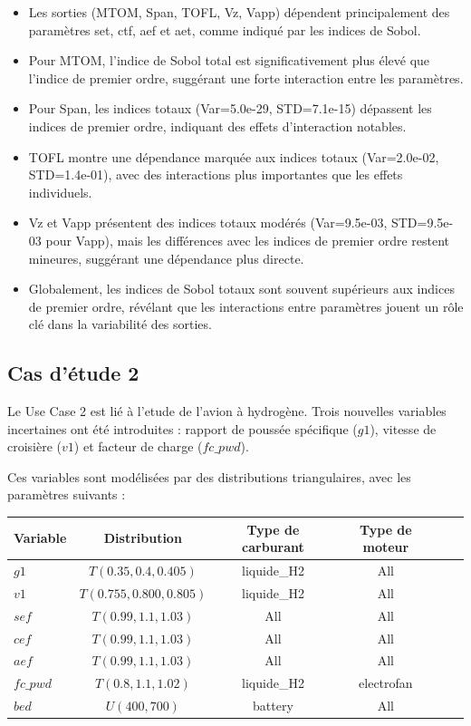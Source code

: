 \documentclass[a4paper, 11pt]{article}
\begin{document}
\begin{itemize}
    \item Les sorties (MTOM, Span, TOFL, Vz, Vapp) dépendent principalement des paramètres set, ctf, aef et aet, comme indiqué par les indices de Sobol.
    \item Pour MTOM, l'indice de Sobol total est significativement plus élevé que l'indice de premier ordre, suggérant une forte interaction entre les paramètres.
    \item Pour Span, les indices totaux (Var=5.0e-29, STD=7.1e-15) dépassent les indices de premier ordre, indiquant des effets d'interaction notables.
    \item TOFL montre une dépendance marquée aux indices totaux (Var=2.0e-02, STD=1.4e-01), avec des interactions plus importantes que les effets individuels.
    \item Vz et Vapp présentent des indices totaux modérés (Var=9.5e-03, STD=9.5e-03 pour Vapp), mais les différences avec les indices de premier ordre restent mineures, suggérant une dépendance plus directe.
    \item Globalement, les indices de Sobol totaux sont souvent supérieurs aux indices de premier ordre, révélant que les interactions entre paramètres jouent un rôle clé dans la variabilité des sorties.
\end{itemize}



\subsection{Cas d'étude 2}


Le Use Case 2 est lié à l'etude de l'avion à hydrogène. Trois nouvelles variables incertaines ont été introduites : rapport de poussée spécifique (\( g1 \)), vitesse de croisière (\( v1 \)) et facteur de charge (\( fc\_pwd \)). \newline

Ces variables sont modélisées par des distributions triangulaires, avec les paramètres suivants :

\begin{center}
\begin{tabular}{lccccc}
\toprule
Variable & Distribution & Type de carburant & Type de moteur \\
\midrule
\( g1 \) & \( T(0.35, 0.4, 0.405) \) & liquide\_H2 & All \\
\( v1 \) & \( T(0.755, 0.800, 0.805) \) & liquide\_H2 & All \\
\( sef \) & \( T(0.99, 1.1, 1.03) \) & All & All \\
\( cef \) & \( T(0.99, 1.1, 1.03) \) & All & All \\
\( aef \) & \( T(0.99, 1.1, 1.03) \) & All & All \\
\( fc\_pwd \) & \( T(0.8, 1.1, 1.02) \) & liquide\_H2 & electrofan \\
\( bed \) & \( U(400, 700) \) & battery & All \\
\bottomrule
\end{tabular}
\end{center}
\end{document}
